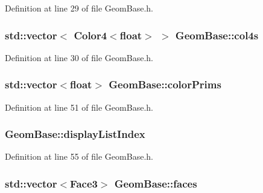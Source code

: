 Definition at line 29 of file Geom\-Base.\-h.

\hypertarget{class_geom_base_a0a55c12de2788567600e4477017df3fb}{
\subsubsection[{col4s}]{\setlength{\rightskip}{0pt plus 5cm}std\-::vector$<$ {\bf Color4}$<$float$>$ $>$ Geom\-Base\-::col4s\hspace{0.3cm}{\ttfamily [protected]}}}\label{class_geom_base_a0a55c12de2788567600e4477017df3fb}


Definition at line 30 of file Geom\-Base.\-h.

\hypertarget{class_geom_base_a9cbaa9c2f3d392874bdf96dbdf426852}{
\subsubsection[{color\-Prims}]{\setlength{\rightskip}{0pt plus 5cm}std\-::vector$<$float$>$ Geom\-Base\-::color\-Prims\hspace{0.3cm}{\ttfamily [protected]}}}\label{class_geom_base_a9cbaa9c2f3d392874bdf96dbdf426852}


Definition at line 51 of file Geom\-Base.\-h.

\hypertarget{class_geom_base_ade5e0a77c4a4488cb449406fdaa14524}{
\subsubsection[{display\-List\-Index}]{ Geom\-Base\-::display\-List\-Index\hspace{0.3cm}{\ttfamily [protected]}}}\label{class_geom_base_ade5e0a77c4a4488cb449406fdaa14524}


Definition at line 55 of file Geom\-Base.\-h.

\hypertarget{class_geom_base_ac267e0a8d536d8f46d21c886cd809fdb}{
\subsubsection[{faces}]{\setlength{\rightskip}{0pt plus 5cm}std\-::vector$<${\bf Face3}$>$ Geom\-Base\-::faces\hspace{0.3cm}{\ttfamily [protected]}}}\label{class_geom_base_ac267e0a8d536d8f46d21c886cd809fdb}


